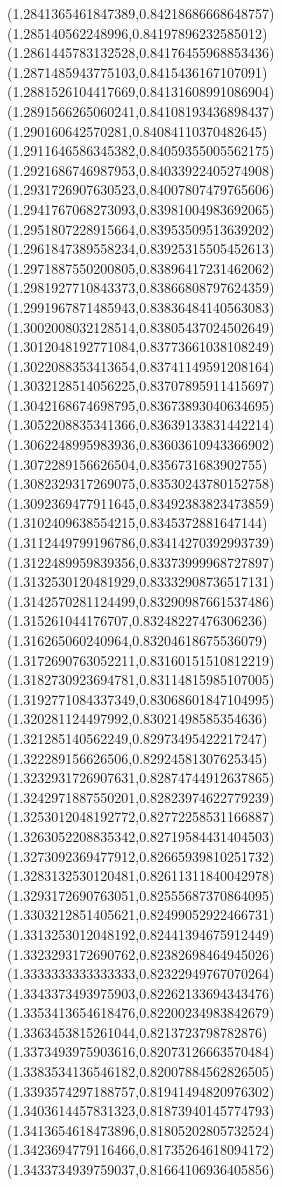 \documentclass[12pt]{article}
\theoremstyle{plain}
\theoremstyle{definition}
\theoremstyle{remark}
\begin{document}
\begin{figure}
{  (1.2841365461847389,0.84218686668648757)%
  (1.285140562248996,0.84197896232585012)%
  (1.2861445783132528,0.84176455968853436)%
  (1.2871485943775103,0.8415436167107091)%
  (1.2881526104417669,0.84131608991086904)%
  (1.2891566265060241,0.84108193436898437)%
  (1.290160642570281,0.84084110370482645)%
  (1.2911646586345382,0.84059355005562175)%
  (1.2921686746987953,0.84033922405274908)%
  (1.2931726907630523,0.84007807479765606)%
  (1.2941767068273093,0.83981004983692065)%
  (1.2951807228915664,0.83953509513639202)%
  (1.2961847389558234,0.83925315505452613)%
  (1.2971887550200805,0.83896417231462062)%
  (1.2981927710843373,0.83866808797624359)%
  (1.2991967871485943,0.83836484140563083)%
  (1.3002008032128514,0.83805437024502649)%
  (1.3012048192771084,0.83773661038108249)%
  (1.3022088353413654,0.83741149591208164)%
  (1.3032128514056225,0.83707895911415697)%
  (1.3042168674698795,0.83673893040634695)%
  (1.3052208835341366,0.83639133831442214)%
  (1.3062248995983936,0.83603610943366902)%
  (1.3072289156626504,0.8356731683902755)%
  (1.3082329317269075,0.83530243780152758)%
  (1.3092369477911645,0.83492383823473859)%
  (1.3102409638554215,0.8345372881647144)%
  (1.3112449799196786,0.83414270392993739)%
  (1.3122489959839356,0.83373999968727897)%
  (1.3132530120481929,0.83332908736517131)%
  (1.3142570281124499,0.83290987661537486)%
  (1.315261044176707,0.83248227476306236)%
  (1.316265060240964,0.83204618675536079)%
  (1.3172690763052211,0.83160151510812219)%
  (1.3182730923694781,0.83114815985107005)%
  (1.3192771084337349,0.83068601847104995)%
  (1.320281124497992,0.83021498585354636)%
  (1.321285140562249,0.82973495422217247)%
  (1.322289156626506,0.82924581307625345)%
  (1.3232931726907631,0.82874744912637865)%
  (1.3242971887550201,0.82823974622779239)%
  (1.3253012048192772,0.82772258531166887)%
  (1.3263052208835342,0.82719584431404503)%
  (1.3273092369477912,0.82665939810251732)%
  (1.3283132530120481,0.82611311840042978)%
  (1.3293172690763051,0.82555687370864095)%
  (1.3303212851405621,0.82499052922466731)%
  (1.3313253012048192,0.82441394675912449)%
  (1.3323293172690762,0.82382698464945026)%
  (1.3333333333333333,0.82322949767070264)%
  (1.3343373493975903,0.82262133694343476)%
  (1.3353413654618476,0.82200234983842679)%
  (1.3363453815261044,0.8213723798782876)%
  (1.3373493975903616,0.82073126663570484)%
  (1.3383534136546182,0.82007884562826505)%
  (1.3393574297188757,0.81941494820976302)%
  (1.3403614457831323,0.81873940145774793)%
  (1.3413654618473896,0.81805202805732524)%
  (1.3423694779116466,0.81735264618094172)%
  (1.3433734939759037,0.81664106936405856)%
}
\end{figure}
\end{document}
